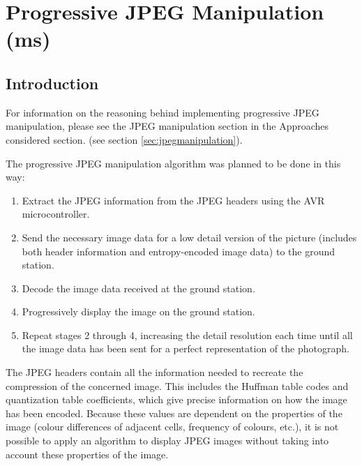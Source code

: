 
\section{Progressive JPEG Manipulation (ms)}
\label{sec:implementation_progressive_jpeg}

\subsection{Introduction}

For information on the reasoning behind implementing 
progressive JPEG manipulation, please see 
the JPEG manipulation section in the 
Approaches considered section. (see section \ref{sec:jpegmanipulation}).

The progressive JPEG manipulation algorithm was planned to be
done in this way:

\begin{enumerate}
	\item Extract the JPEG information from the JPEG headers 
		using the AVR microcontroller.
	\item Send the necessary image data for a low detail
	         version of the picture (includes both header information
		and entropy-encoded image data) to the ground station.
	\item Decode the image data received at the ground station.
	\item Progressively display the image on the ground station.
	\item Repeat stages 2 through 4, increasing the detail resolution 
		each time until all the image data has been sent for a perfect 
		representation of the photograph.
\end{enumerate}

The JPEG headers contain all the information needed to
recreate the compression of the concerned image. This includes
the Huffman table codes and quantization table coefficients,
which give precise information on how the image has been encoded.
Because these values are dependent on the properties of the image
(colour differences of adjacent cells, frequency of colours, etc.), it
is not possible to apply an algorithm to display JPEG images without
taking into account these properties of the image.

